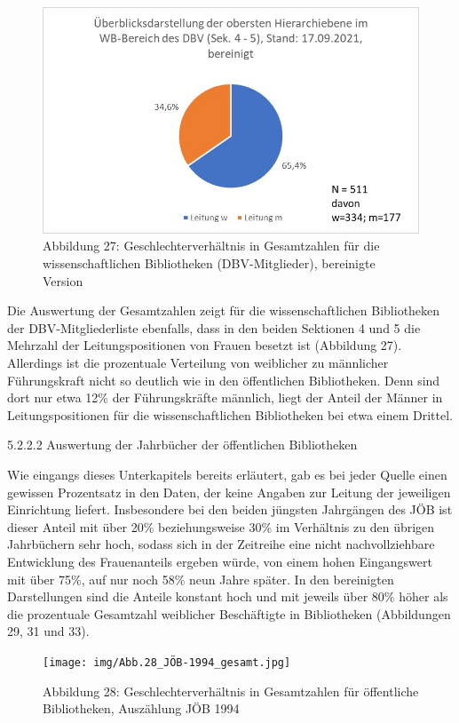 \documentclass[a4paper,
fontsize=11pt,
oneside,
numbers=noperiodatend,
parskip=half-,
bibliography=totoc,
final
]{scrartcl}
\begin{document}
\begin{figure}
\centering
\includegraphics{img/Abb.27_DBV-Sek4-5_gesamt_bereinigt.jpg}
\caption{Abbildung 27: Geschlechterverhältnis in Gesamtzahlen für die
wissenschaftlichen Bibliotheken (DBV-Mitglieder), bereinigte Version}
\end{figure}

Die Auswertung der Gesamtzahlen zeigt für die wissenschaftlichen
Bibliotheken der DBV-Mitgliederliste ebenfalls, dass in den beiden
Sektionen 4 und 5 die Mehrzahl der Leitungspositionen von Frauen besetzt
ist (Abbildung 27). Allerdings ist die prozentuale Verteilung von
weiblicher zu männlicher Führungskraft nicht so deutlich wie in den
öffentlichen Bibliotheken. Denn sind dort nur etwa 12\% der
Führungskräfte männlich, liegt der Anteil der Männer in
Leitungspositionen für die wissenschaftlichen Bibliotheken bei etwa
einem Drittel.

5.2.2.2 Auswertung der Jahrbücher der öffentlichen Bibliotheken

Wie eingangs dieses Unterkapitels bereits erläutert, gab es bei jeder
Quelle einen gewissen Prozentsatz in den Daten, der keine Angaben zur
Leitung der jeweiligen Einrichtung liefert. Insbesondere bei den beiden
jüngsten Jahrgängen des JÖB ist dieser Anteil mit über 20\%
beziehungsweise 30\% im Verhältnis zu den übrigen Jahrbüchern sehr hoch,
sodass sich in der Zeitreihe eine nicht nachvollziehbare Entwicklung des
Frauenanteils ergeben würde, von einem hohen Eingangswert mit über 75\%,
auf nur noch 58\% neun Jahre später. In den bereinigten Darstellungen
sind die Anteile konstant hoch und mit jeweils über 80\% höher als die
prozentuale Gesamtzahl weiblicher Beschäftigte in Bibliotheken
(Abbildungen 29, 31 und 33).

\begin{figure}
\centering
\texttt{[image: img/Abb.28\_JÖB-1994\_gesamt.jpg]}
\caption{Abbildung 28: Geschlechterverhältnis in Gesamtzahlen für
öffentliche Bibliotheken, Auszählung JÖB 1994}
\end{figure}
\end{document}
